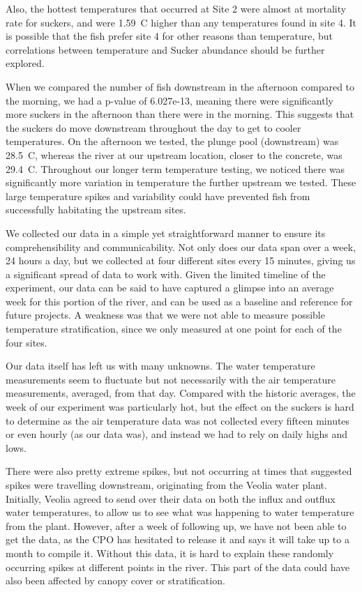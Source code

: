 \documentclass{article}\usepackage[]{graphicx}\usepackage[]{color}
\begin{document}
Also, the hottest temperatures that occurred at Site 2 were almost at mortality rate for suckers, and were 1.59\textdegree~C higher than any temperatures found in site 4. It is possible that the fish prefer site 4 for other reasons than temperature, but correlations between temperature and Sucker abundance should be further explored.

When we compared the number of fish downstream in the afternoon compared to the morning, we had a p-value of 6.027e-13, meaning there were significantly more suckers in the afternoon than there were in the morning.  This suggests that the suckers do move downstream throughout the day to get to cooler temperatures.  On the afternoon we tested, the plunge pool (downstream) was 28.5\textdegree~C, whereas the river at our upstream location, closer to the concrete, was 29.4\textdegree~C. Throughout our longer term temperature testing, we noticed there was significantly more variation in temperature the further upstream we tested. These large temperature spikes and variability could have prevented fish from successfully habitating the upstream sites. 


We collected our data in a simple yet straightforward manner to ensure its comprehensibility and communicability. Not only does our data span over a week, 24 hours a day, but we collected at four different sites every 15 minutes, giving us a significant spread of data to work with. Given the limited timeline of the experiment, our data can be said to have captured a glimpse into an average week for this portion of the river, and can be used as a baseline and reference for future projects. A weakness was that we were not able to measure possible temperature stratification, since we only measured at one point for each of the four sites. 

Our data itself has left us with many unknowns. The water temperature measurements seem to fluctuate but not necessarily with the air temperature measurements, averaged, from that day. Compared with the historic averages, the week of our experiment was particularly hot, but the effect on the suckers is hard to determine as the air temperature data was not collected every fifteen minutes or even hourly (as our data was), and instead we had to rely on daily highs and lows. 

There were also pretty extreme spikes, but not occurring at times that suggested spikes were travelling downstream, originating from the Veolia water plant. Initially, Veolia agreed to send over their data on both the influx and outflux water temperatures, to allow us to see what was happening to water temperature from the plant. However, after a week of following up, we have not been able to get the data, as the CPO has hesitated to release it and says it will take up to a month to compile it. Without this data, it is hard to explain these randomly occurring spikes at different points in the river. This part of the data could have also been affected by canopy cover or stratification. 
\end{document}
